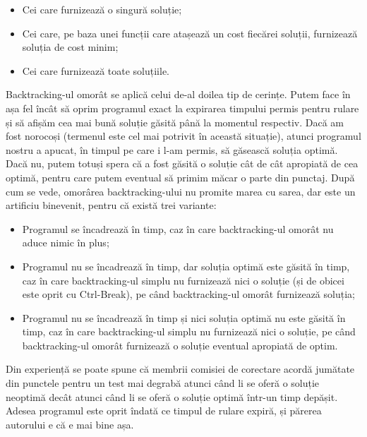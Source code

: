 \begin{itemize}

\item Cei care furnizează o singură soluție;

\item Cei care, pe baza unei funcții care atașează un cost fiecărei soluții,
  furnizează soluția de cost minim;

\item Cei care furnizează toate soluțiile.
\end{itemize}

Backtracking-ul omorât se aplică celui de-al doilea tip de cerințe. Putem face
în așa fel încât să oprim programul exact la expirarea timpului permis pentru
rulare și să afișăm cea mai bună soluție găsită până la momentul
respectiv. Dacă am fost norocoși (termenul este cel mai potrivit în această
situație), atunci programul nostru a apucat, în timpul pe care i l-am permis,
să găsească soluția optimă. Dacă nu, putem totuși spera că a fost găsită o
soluție cât de cât apropiată de cea optimă, pentru care putem eventual să
primim măcar o parte din punctaj. După cum se vede, omorârea backtracking-ului
nu promite marea cu sarea, dar este un artificiu binevenit, pentru că există
trei variante:

\begin{itemize}

\item Programul se încadrează în timp, caz în care backtracking-ul omorât nu
  aduce nimic în plus;

\item Programul nu se încadrează în timp, dar soluția optimă este găsită în
  timp, caz în care backtracking-ul simplu nu furnizează nici o soluție (și de
  obicei este oprit cu Ctrl-Break), pe când backtracking-ul omorât furnizează
  soluția;

\item Programul nu se încadrează în timp și nici soluția optimă nu este găsită
  în timp, caz în care backtracking-ul simplu nu furnizează nici o soluție, pe
  când backtracking-ul omorât furnizează o soluție eventual apropiată de
  optim.

\end{itemize}

Din experiență se poate spune că membrii comisiei de corectare acordă jumătate
din punctele pentru un test mai degrabă atunci când li se oferă o soluție
neoptimă decât atunci când li se oferă o soluție optimă într-un timp
depășit. Adesea programul este oprit îndată ce timpul de rulare expiră, și
părerea autorului e că e mai bine așa.

